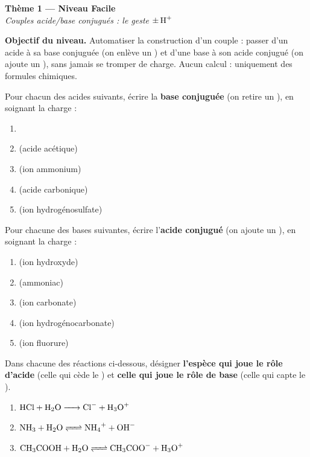 \documentclass[11pt,a4paper]{article}
\begin{document}
\begin{center}
{\LARGE\bfseries\color{primarydark} Thème 1 --- Niveau Facile}\\[2pt]
{\color{primary}\itshape Couples acide/base conjugués : le geste $\pm\,\ce{H+}$}
\end{center}

\begin{consigne}
\textbf{Objectif du niveau.} Automatiser la construction d'un couple : passer d'un acide à sa base conjuguée
(on enlève un ) et d'une base à son acide conjugué (on ajoute un ), sans jamais se tromper de
charge. Aucun calcul : uniquement des formules chimiques.
\end{consigne}

\begin{exobox}
Pour chacun des acides suivants, écrire la \textbf{base conjuguée} (on retire un ), en soignant la charge :
\begin{enumerate}[label=\alph*),leftmargin=1.6em,itemsep=1pt]
  \item {}
  \item {} (acide acétique)
  \item {} (ion ammonium)
  \item {} (acide carbonique)
  \item {} (ion hydrogénosulfate)
\end{enumerate}
\end{exobox}

\begin{exobox}
Pour chacune des bases suivantes, écrire l'\textbf{acide conjugué} (on ajoute un ), en soignant la charge :
\begin{enumerate}[label=\alph*),leftmargin=1.6em,itemsep=1pt]
  \item {} (ion hydroxyde)
  \item {} (ammoniac)
  \item {} (ion carbonate)
  \item {} (ion hydrogénocarbonate)
  \item {} (ion fluorure)
\end{enumerate}
\end{exobox}

\begin{exobox}
Dans chacune des réactions ci-dessous, désigner \textbf{l'espèce qui joue le rôle d'acide} (celle qui cède
le ) et \textbf{celle qui joue le rôle de base} (celle qui capte le ).
\begin{enumerate}[label=\alph*),leftmargin=1.6em,itemsep=2pt]
  \item $\ce{HCl + H2O -> Cl- + H3O+}$
  \item $\ce{NH3 + H2O <=> NH4+ + OH-}$
  \item $\ce{CH3COOH + H2O <=> CH3COO- + H3O+}$
\end{enumerate}
\end{exobox}
\end{document}
